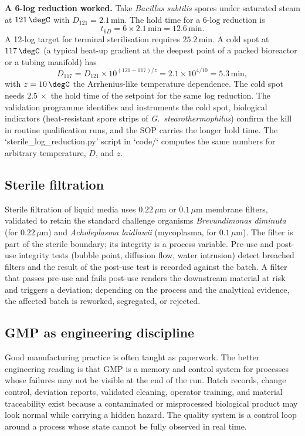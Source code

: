 \textbf{A 6-log reduction worked.} Take \emph{Bacillus subtilis} spores
under saturated steam at $121\,\degC$ with $D_{121} = 2.1\,\text{min}$.
The hold time for a 6-log reduction is
\[
t_{6D} = 6 \times 2.1\,\text{min} = 12.6\,\text{min}.
\]
A 12-log target for terminal sterilisation requires $25.2\,\text{min}$.
A cold spot at $117\,\degC$ (a typical heat-up gradient at the deepest
point of a packed bioreactor or a tubing manifold) has
\[
D_{117} = D_{121} \times 10^{(121 - 117)/z}
= 2.1 \times 10^{4/10}
= 5.3\,\text{min},
\]
with $z = 10\,\degC$ the Arrhenius-like temperature dependence. The
cold spot needs $2.5\,\times$ the hold time of the setpoint for the
same log reduction. The validation programme identifies and instruments
the cold spot, biological indicators (heat-resistant spore strips of
\emph{G.\ stearothermophilus}) confirm the kill in routine
qualification runs, and the SOP carries the longer hold time. The
`sterile_log_reduction.py' script in `code/` computes the same numbers
for arbitrary temperature, $D$, and $z$.

\subsection{Sterile filtration}

Sterile filtration of liquid media uses $0.22\,\mu\text{m}$ or
$0.1\,\mu\text{m}$ membrane filters, validated to retain the standard
challenge organisms \emph{Brevundimonas diminuta} (for
$0.22\,\mu\text{m}$) and \emph{Acholeplasma laidlawii} (mycoplasma, for
$0.1\,\mu\text{m}$). The filter is part of the sterile boundary; its
integrity is a process variable. Pre-use and post-use integrity tests
(bubble point, diffusion flow, water intrusion) detect breached filters
and the result of the post-use test is recorded against the batch. A
filter that passes pre-use and fails post-use renders the downstream
material at risk and triggers a deviation; depending on the process and
the analytical evidence, the affected batch is reworked, segregated, or
rejected.

\subsection{GMP as engineering discipline}

Good manufacturing practice is often taught as paperwork. The better
engineering reading is that GMP is a memory and control system for
processes whose failures may not be visible at the end of the run. Batch
records, change control, deviation reports, validated cleaning, operator
training, and material traceability exist because a contaminated or
misprocessed biological product may look normal while carrying a hidden
hazard. The quality system is a control loop around a process whose
state cannot be fully observed in real time.


